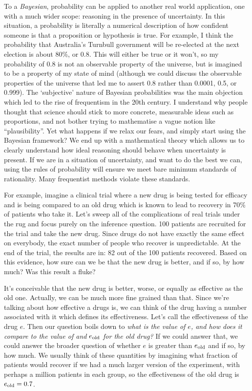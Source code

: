 \documentclass[a4paper, 12pt]{article}
\begin{document}
To a {\em Bayesian}, probability can be applied to another real world
application, one with a much wider scope: reasoning in the presence of
uncertainty. In this situation, a probability is literally a numerical
description of how confident someone is that a proposition or hypothesis is
true. For example,
I think the probability that Australia's Turnbull government will be
re-elected at the next election is about 80\%, or 0.8. This will either be true
or it won't, so my probability of 0.8 is not an observable property of
the universe, but is imagined to be a property of my state of mind
(although we could
discuss the observable properties of the universe that led me to assert 0.8
rather than 0.0001, 0.5, or 0.999). The `subjective' nature of Bayesian
probabilities was the main objection which led to the rise of frequentism in
the 20th century. I understand why people thought that science should stick
to more concrete, measurable ideas such as proportions, and not bother trying
to mathematise a vague notion like ``plausibility''.
Yet what happens if we relax our fears, and simply start using the Bayesian
framework? We end up with a mathematical theory which allows us to clearly
understand how ideal reasoning should behave when uncertainty is present. If we
are in a situation of uncertainty, and want to do the best we can, using the
rules of probability will ensure we meet bare minimum standards of rationality.
Many frequentist methods violate these standards.

For example, imagine a clinical trial where a new drug is being tested for
efficacy and is being compared to an old drug which is known to lead to
recovery in 70\% of patients who take it. Let's sweep all of the complications
of real trials under the rug and focus purely on the inference question.
100 patients are recruited for the trial and take the new drug. Since
drugs do not have exactly the same effect on everybody,
the exact number of people who recover is unpredictable.
At the end of the trial, the results are in: 82 out of the 100 patients
recovered. Based on this evidence, how sure can we be that the new
drug is better, and if so, by how much?
Was this result a fluke?

It's conceivable that the new drug is better, worse, or equally as effective as
the old one. Actually, we can be much more fine grained than that.
Since we're talking about how effective
a drugs is, we can think of the drug having a number associated with it
which defines its effectiveness. Let's call the effectiveness of the drug
$e$. Then our question boils
down to {\em what is the value of $e$, and how does it compare to the value
of and $e_{\rm old}$ for the old drug?} If we could answer that,
we could answer the broader question of whether $e$ is greater than
$e_{\rm old}$ and if so, by how much. We usually think of these quantities by imagining what
fraction of patients would recover if we had a much larger version of the
experiment, with perhaps a million patients in each group, so the effectiveness
of the old drug is $e_{\rm old} = 0.7$.
\end{document}
